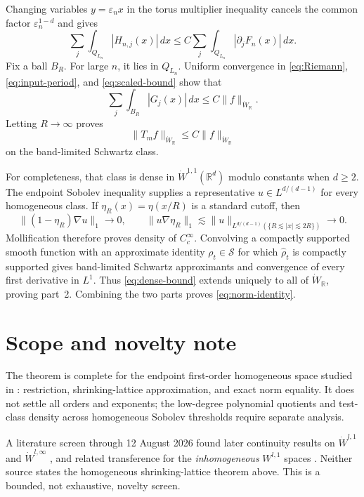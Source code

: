 \documentclass[11pt]{article}
\newcommand{\R}{\mathbb R}
\newcommand{\eps}{\varepsilon}
\newcommand{\wh}{\widehat}
\begin{document}
Changing variables $y=\eps_nx$ in the torus multiplier inequality cancels
the common factor $\eps_n^{1-d}$ and gives
\begin{equation}\label{eq:scaled-bound}
 \sum_j\int_{Q_{L_n}}|H_{n,j}(x)|\,dx
 \le C\sum_j\int_{Q_{L_n}}|\partial_jF_n(x)|\,dx.
\end{equation}
Fix a ball $B_R$.  For large $n$, it lies in $Q_{L_n}$.  Uniform convergence
in \eqref{eq:Riemann}, \eqref{eq:input-period}, and
\eqref{eq:scaled-bound} show that
\[
 \sum_j\int_{B_R}|G_j(x)|\,dx\le C\|f\|_{\dot W_{\R}}.
\]
Letting $R\to\infty$ proves
\begin{equation}\label{eq:dense-bound}
 \|T_mf\|_{\dot W_{\R}}\le C\|f\|_{\dot W_{\R}}
\end{equation}
on the band-limited Schwartz class.

For completeness, that class is dense in $\dot W^{1,1}(\R^d)$ modulo
constants when $d\ge2$.  The endpoint Sobolev inequality supplies a
representative $u\in L^{d/(d-1)}$ for every homogeneous class.  If
$\eta_R(x)=\eta(x/R)$ is a standard cutoff, then
\[
 \|(1-\eta_R)\nabla u\|_1\to0,
 \qquad
 \|u\nabla\eta_R\|_1
 \lesssim\|u\|_{L^{d/(d-1)}(\{R\lesssim|x|\lesssim2R\})}\to0.
\]
Mollification therefore proves density of $C_c^\infty$.  Convolving a
compactly supported smooth function with an approximate identity
$\rho_t\in\mathcal S$ for which $\wh\rho_t$ is compactly supported gives
band-limited Schwartz approximants and convergence of every first derivative
in $L^1$.  Thus \eqref{eq:dense-bound} extends uniquely to all of
$\dot W_{\R}$, proving part~2.  Combining the two parts proves
\eqref{eq:norm-identity}.

\section{Scope and novelty note}

The theorem is complete for the endpoint first-order homogeneous space
studied in \cite{KW}: restriction, shrinking-lattice approximation, and
exact norm equality.  It does not settle all orders and exponents; the
low-degree polynomial quotients and test-class density across homogeneous
Sobolev thresholds require separate analysis.

A literature screen through 12 August 2026 found later continuity results on
$\dot W^{l,1}$ and $\dot W^{l,\infty}$ \cite{Curca}, and related transference
for the \emph{inhomogeneous} $W^{l,1}$ spaces \cite{CW}.  Neither source
states the homogeneous shrinking-lattice theorem above.  This is a bounded,
not exhaustive, novelty screen.
\end{document}
